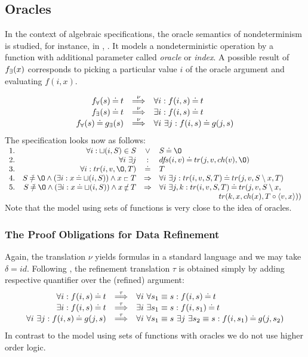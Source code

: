 \subsection{Oracles}
In the context of algebraic specifications, the oracle semantics of nondeterminism is studied, for instance, in \cite{Mich}, \cite{top}. It models a nondeterministic operation by a function with additional parameter called {\em oracle} or {\em index}. A possible result of $f_\exists(x)$ corresponds to picking a particular value $i$ of the oracle argument and evaluating $f(i,x).$ 

\begin{equation}\label{eq:oraclenu}
\begin{array}{rcl}
f_\forall(s) \mathbin{\doteq} t & \mathbin{\stackrel{\nu}{\Longrightarrow}} & \forall i: f(i,s)\mathbin{\doteq} t \\ f_\exists(s) \mathbin{\doteq} t & \mathbin{\stackrel{\nu}{\Longrightarrow}} & \exists i: f(i,s)\mathbin{\doteq} t\\ f_\forall(s) \mathbin{\doteq} g_\exists(s) & \mathbin{\stackrel{\nu}{\Longrightarrow}} &
\forall i\ \exists j : f(i,s)\mathbin{\doteq} g(j,s) \\ \end{array}
\end{equation}
\noindent The specification looks now as follows:\\[1ex] \(\begin{array}{rrcl}
1.& \forall i : \ch(i,S)\in S & \lor & S\Eq\es \\ 2. & \forall i\ \exists j & : & \dfs(i,v)\Eq tr(j,v,ch(v),\es)\ \ \\ 3. & \forall i : tr(i,v,\es,T) & \Eq & T \\ 4. & S\Not\Eq\es\land (\exists i: x\Eq \ch(i,S))\land x\lin T & \impl & \forall i\ \exists j :tr(i,v,S,T)\Eq tr(j,v,S\setminus x,T) \\ 5. & S\Not\Eq\es\land (\exists i: x\Eq \ch(i,S))\land x\Not\lin T & \impl & \forall i\ \exists j,k :tr(i,v,S,T)\Eq 
tr(j,v,S\setminus x,\ \ \ \ \ \ \ \ \\
\multicolumn{4}{r}{tr(k,x,ch(x),T\ap\<v,x\>))} \end{array} \)\\[1ex]
\noindent
Note that the model using sets of functions is very close to the idea of oracles.
\subsubsection{The Proof Obligations for Data Refinement} Again, the translation $\nu$ yields formulas in a standard language and we may take $\delta = id.$ Following , the refinement translation $\tau$ is obtained simply by adding respective quantifier over the (refined) argument: \begin{equation}\label{eq:oracletau}
\begin{array}{rcl}
\forall i: f(i,s)\Eq t & \TTo{\tau} &
\forall i\ \forall s_1\equiv s: f(i,s)\Eq t \\ \exists i: f(i,s)\Eq t & \TTo{\tau} &
\exists i\ \exists s_1\equiv s: f(i,s_1)\Eq t\\ \forall i\ \exists j : f(i,s)\Eq g(j,s) & \TTo{\tau} & \forall i\ \forall s_1\equiv s\ \exists j\ \exists s_2\equiv s:f(i,s_1)\Eq g(j,s_2)
\end{array}
\end{equation}
In contrast to the model using sets of functions with oracles we do not use higher order logic.
